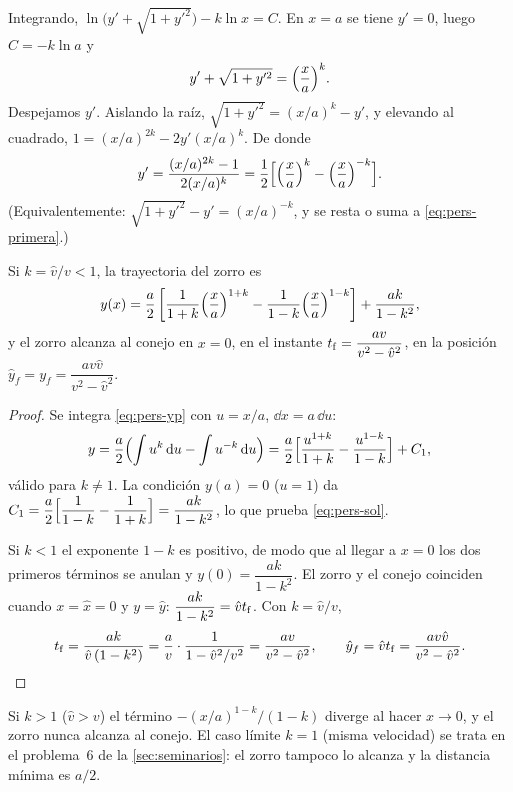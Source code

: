 Integrando, $\ln\bigl(y'+\sqrt{1+y'^2}\bigr)-k\ln x=C$. En $x=a$ se tiene $y'=0$, luego $C=-k\ln a$ y
\begin{equation}
  y'+\sqrt{1+y'^2}=\Bigl(\frac{x}{a}\Bigr)^{k}.
  \label{eq:pers-primera}
\end{equation}
Despejamos $y'$. Aislando la raíz, $\sqrt{1+y'^2}=(x/a)^k-y'$, y elevando al cuadrado, $1=(x/a)^{2k}-2y'(x/a)^k$. De donde
\begin{equation}
  y'=\frac{(x/a)^{2k}-1}{2(x/a)^k}=\frac12\Bigl[\Bigl(\frac{x}{a}\Bigr)^{k}-\Bigl(\frac{x}{a}\Bigr)^{-k}\Bigr].
  \label{eq:pers-yp}
\end{equation}
(Equivalentemente: $\sqrt{1+y'^2}-y'=(x/a)^{-k}$, y se resta o suma a \eqref{eq:pers-primera}.)

\begin{theorem}\label{thm:persecucion}
Si $k=\hat v/v<1$, la trayectoria del zorro es
\begin{equation}
  y(x)=\frac a2\left[\frac{1}{1+k}\Bigl(\frac{x}{a}\Bigr)^{1+k}-\frac{1}{1-k}\Bigl(\frac{x}{a}\Bigr)^{1-k}\right]+\frac{ak}{1-k^2},
  \label{eq:pers-sol}
\end{equation}
y el zorro alcanza al conejo en $x=0$, en el instante $t_{\mathrm{f}}=\dfrac{av}{v^2-\hat v^2}$, en la posición $\hat y_f=y_f=\dfrac{a v\hat v}{v^2-\hat v^2}$.
\end{theorem}

\begin{proof}
Se integra \eqref{eq:pers-yp} con $u=x/a$, $\dd x=a\,\dd u$:
\[
  y=\frac a2\Bigl(\int u^{k}\,\mathrm{d} u-\int u^{-k}\,\mathrm{d} u\Bigr)
   =\frac a2\Bigl[\frac{u^{1+k}}{1+k}-\frac{u^{1-k}}{1-k}\Bigr]+C_1 ,
\]
válido para $k\neq1$. La condición $y(a)=0$ ($u=1$) da $C_1=\dfrac a2\Bigl[\dfrac{1}{1-k}-\dfrac{1}{1+k}\Bigr]=\dfrac{ak}{1-k^2}$, lo que prueba \eqref{eq:pers-sol}.

Si $k<1$ el exponente $1-k$ es positivo, de modo que al llegar a $x=0$ los dos primeros términos se anulan y $y(0)=\dfrac{ak}{1-k^2}$. El zorro y el conejo coinciden cuando $x=\hat x=0$ y $y=\hat y$: $\dfrac{ak}{1-k^2}=\hat vt_{\mathrm{f}}$. Con $k=\hat v/v$,
\[
  t_{\mathrm{f}}=\frac{ak}{\hat v\,(1-k^2)}=\frac{a}{v}\cdot\frac{1}{1-\hat v^2/v^2}=\frac{av}{v^2-\hat v^2},
  \qquad
  \hat y_f=\hat vt_{\mathrm{f}}=\frac{av\hat v}{v^2-\hat v^2}.
\]
\end{proof}

\begin{remark}
Si $k>1$ ($\hat v>v$) el término $-(x/a)^{1-k}/(1-k)$ diverge al hacer $x\to0$, y el zorro nunca alcanza al conejo. El caso límite $k=1$ (misma velocidad) se trata en el problema~6 de la \cref{sec:seminarios}: el zorro tampoco lo alcanza y la distancia mínima es $a/2$.
\end{remark}

